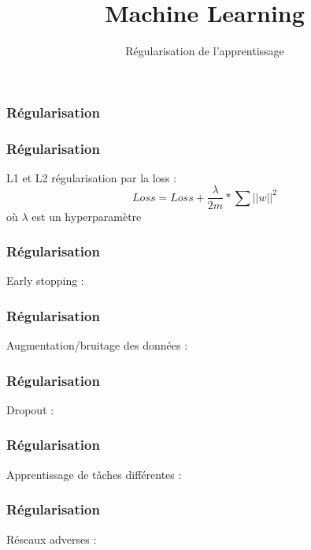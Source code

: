 \documentclass{formation}
\title{Machine Learning}
\subtitle{Régularisation de l'apprentissage}
\begin{document}
\maketitle

\begin{frame}
  \frametitle{Régularisation}
\end{frame}

\begin{frame}
  \frametitle{Régularisation}
  L1 et L2 régularisation par la loss : \\
  \[
  Loss = Loss + \frac{\lambda}{2m}*\sum||w||^2
  \]
  où $\lambda$ est un hyperparamètre
\end{frame}

\begin{frame}
  \frametitle{Régularisation}
  Early stopping :
\end{frame}

\begin{frame}
  \frametitle{Régularisation}
  Augmentation/bruitage des données :
\end{frame}

\begin{frame}
  \frametitle{Régularisation}
  Dropout :
\end{frame}

\begin{frame}
  \frametitle{Régularisation}
  Apprentissage de tâches différentes :
\end{frame}

\begin{frame}
  \frametitle{Régularisation}
  Réseaux adverses :
\end{frame}
\end{document}
